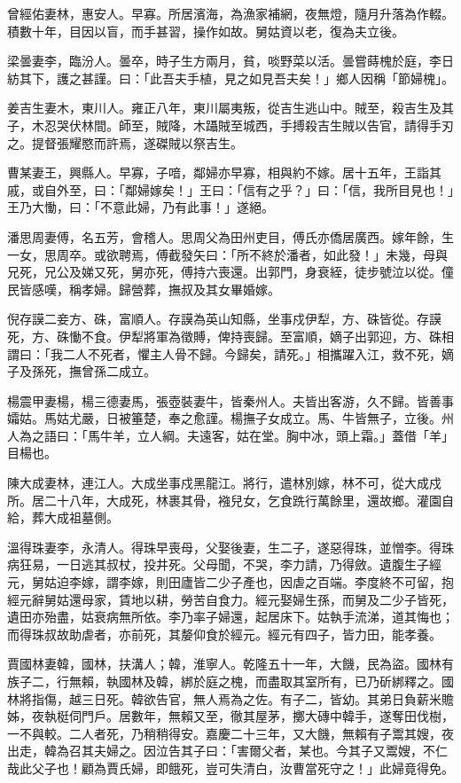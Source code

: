 \begin{pinyinscope}
曾經佑妻林，惠安人。早寡。所居濱海，為漁家補網，夜無燈，隨月升落為作輟。積數十年，目因以盲，而手甚習，操作如故。舅姑資以老，復為夫立後。

梁曇妻李，臨汾人。曇卒，時子生方兩月，貧，啖野菜以活。曇嘗蒔槐於庭，李日紡其下，護之甚謹。曰：「此吾夫手植，見之如見吾夫矣！」鄉人因稱「節婦槐」。

姜吉生妻木，東川人。雍正八年，東川屬夷叛，從吉生逃山中。賊至，殺吉生及其子，木忍哭伏林間。師至，賊降，木躡賊至城西，手搏殺吉生賊以告官，請得手刃之。提督張耀愍而許焉，遂磔賊以祭吉生。

曹某妻王，興縣人。早寡，子喑，鄰婦亦早寡，相與約不嫁。居十五年，王詣其戚，或自外至，曰：「鄰婦嫁矣！」王曰：「信有之乎？」曰：「信，我所目見也！」王乃大慟，曰：「不意此婦，乃有此事！」遂絕。

潘思周妻傅，名五芳，會稽人。思周父為田州吏目，傅氏亦僑居廣西。嫁年餘，生一女，思周卒。或欲聘焉，傅截發矢曰：「所不終於潘者，如此發！」未幾，母與兄死，兄公及娣又死，舅亦死，傅持六喪還。出郭門，身衰絰，徒步號泣以從。僮民皆感嘆，稱孝婦。歸營葬，撫叔及其女畢婚嫁。

倪存謨二妾方、硃，富順人。存謨為英山知縣，坐事戍伊犁，方、硃皆從。存謨死，方、硃慟不食。伊犁將軍為徵賻，俾持喪歸。至富順，嫡子出郭迎，方、硃相謂曰：「我二人不死者，懼主人骨不歸。今歸矣，請死。」相攜躍入江，救不死，嫡子及孫死，撫曾孫二成立。

楊震甲妻楊，楊三德妻馬，張壺裝妻牛，皆秦州人。夫皆出客游，久不歸。皆善事孀姑。馬姑尤嚴，日被箠楚，奉之愈謹。楊撫子女成立。馬、牛皆無子，立後。州人為之語曰：「馬牛羊，立人綱。夫遠客，姑在堂。胸中冰，頭上霜。」蓋借「羊」目楊也。

陳大成妻林，連江人。大成坐事戍黑龍江。將行，遣林別嫁，林不可，從大成戍所。居二十八年，大成死，林裹其骨，襁兒女，乞食跣行萬餘里，還故鄉。灌園自給，葬大成祖墓側。

溫得珠妻李，永清人。得珠早喪母，父娶後妻，生二子，遂惡得珠，並憎李。得珠病狂易，一日逃其叔杖，投井死。父母聞，不哭，李力請，乃得斂。遺腹生子經元，舅姑迫李嫁，謂李嫁，則田廬皆二少子產也，因虐之百端。李度終不可留，抱經元辭舅姑還母家，賃地以耕，勞苦自食力。經元娶婦生孫，而舅及二少子皆死，遺田亦殆盡，姑衰病無所依。李乃率子婦還，起居床下。姑執手流涕，道其悔也；而得珠叔故助虐者，亦前死，其嫠仰食於經元。經元有四子，皆力田，能孝養。

賈國林妻韓，國林，扶溝人；韓，淮寧人。乾隆五十一年，大饑，民為盜。國林有族子二，行無賴，執國林及韓，綁於庭之槐，而盡取其室所有，已乃斫綁釋之。國林將指傷，越三日死。韓欲告官，無人焉為之佐。有子二，皆幼。其弟日負薪米贍姊，夜執梃伺門戶。居數年，無賴又至，徹其屋茅，擲大磚中韓手，遂奪田伐樹，一不與較。二人者死，乃稍稍得安。嘉慶二十三年，又大饑，無賴有子鬻其嫂，夜出走，韓為召其夫婦之。因泣告其子曰：「害爾父者，某也。今其子又鬻嫂，不仁哉此父子也！顧為賈氏婦，即餓死，豈可失清白，汝曹當死守之！」此婦竟得免。


\end{pinyinscope}

